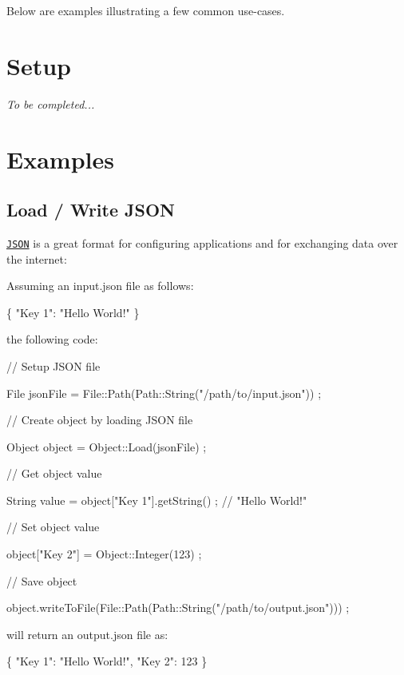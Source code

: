 Below are examples illustrating a few common use-\/cases.\hypertarget{md_docs__tutorial_Setup}{}\section{Setup}\label{md_docs__tutorial_Setup}
{\itshape To be completed...}\hypertarget{md_docs__tutorial_Examples}{}\section{Examples}\label{md_docs__tutorial_Examples}
\hypertarget{md_docs__tutorial_JSON}{}\subsection{Load / Write J\+S\+ON}\label{md_docs__tutorial_JSON}
\href{https://en.wikipedia.org/wiki/JSON}{\tt J\+S\+ON} is a great format for configuring applications and for exchanging data over the internet\+:

Assuming an {\ttfamily input.\+json} file as follows\+:


\begin{DoxyCode}
\{
    "Key 1": "Hello World!"
\}
\end{DoxyCode}


the following code\+:


\begin{DoxyCode}
\textcolor{comment}{// Setup JSON file}

File jsonFile = File::Path(Path::String(\textcolor{stringliteral}{"/path/to/input.json"})) ;

\textcolor{comment}{// Create object by loading JSON file}

Object \textcolor{keywordtype}{object} = Object::Load(jsonFile) ;

\textcolor{comment}{// Get object value}

String value = \textcolor{keywordtype}{object}[\textcolor{stringliteral}{"Key 1"}].getString() ; \textcolor{comment}{// "Hello World!"}

\textcolor{comment}{// Set object value}

\textcolor{keywordtype}{object}[\textcolor{stringliteral}{"Key 2"}] = Object::Integer(123) ;

\textcolor{comment}{// Save object}

\textcolor{keywordtype}{object}.writeToFile(File::Path(Path::String(\textcolor{stringliteral}{"/path/to/output.json"}))) ;
\end{DoxyCode}


will return an {\ttfamily output.\+json} file as\+:


\begin{DoxyCode}
\{
    "Key 1": "Hello World!",
    "Key 2": 123
\}
\end{DoxyCode}
 
